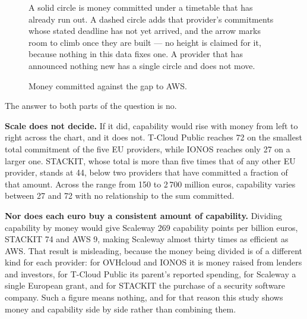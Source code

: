 \begin{figure}[htbp]

  \vspace{2pt}
  {\footnotesize\raggedright
  A solid circle is money committed under a timetable that has already run out. A
  dashed circle adds that provider's commitments whose stated deadline has not yet
  arrived, and the arrow marks room to climb once they are built --- no height is
  claimed for it, because nothing in this data fixes one. A provider that has
  announced nothing new has a single circle and does not move.\par}
  \caption{Money committed against the gap to \acs{AWS}.}
  \label{fig:capital-gap}
\end{figure}

The answer to both parts of the question is no.

\textbf{Scale does not decide.} If it did, capability would rise with money from
left to right across the chart, and it does not. T-Cloud Public reaches 72 on the
smallest total commitment of the five \acs{EU} providers, while IONOS reaches only
27 on a larger one. STACKIT, whose total is more than five times that of any other
\acs{EU} provider, stands at 44, below two providers that have committed a
fraction of that amount. Across the range from 150 to 2\,700 million euros,
capability varies between 27 and 72 with no relationship to the sum committed.

\textbf{Nor does each euro buy a consistent amount of capability.} Dividing
capability by money would give Scaleway 269 capability points per billion euros,
STACKIT 74 and \acs{AWS} 9, making Scaleway almost thirty times as efficient as
\acs{AWS}. That result is misleading, because the money being divided is of a different kind
for each provider: for OVHcloud and IONOS it is money raised from lenders
and investors, for T-Cloud Public its parent's reported spending, for Scaleway a
single European grant, and for STACKIT the purchase of a security software
company. Such a figure means nothing, and for that reason this study shows money and
capability side by side rather than combining them.

